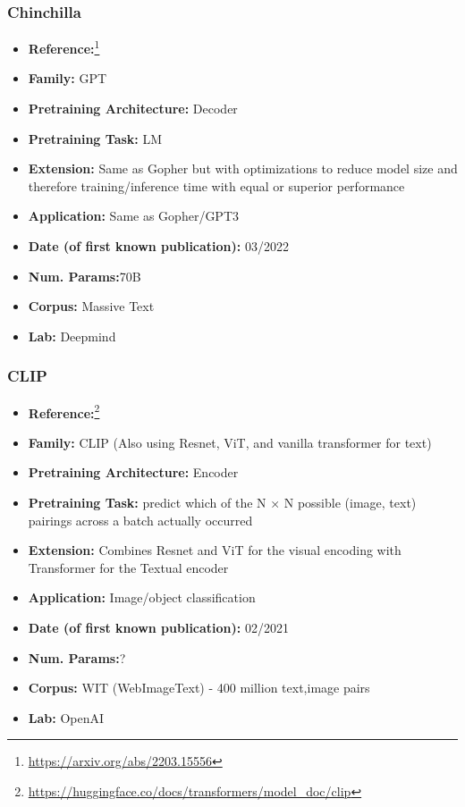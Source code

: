 \documentclass{article}
\begin{document}
\subsubsection{Chinchilla}

            \begin{itemize}
                \item \textbf{Reference:}\footnote{\url{https://arxiv.org/abs/2203.15556}}\cite{hoffmann2022training}
                \item \textbf{Family:} GPT 
                \item \textbf{Pretraining Architecture:} Decoder
                \item \textbf{Pretraining Task:} LM
                \item \textbf{Extension:} Same as Gopher but with optimizations to reduce model size and therefore training/inference time with equal or superior performance  
                \item \textbf{Application:} Same as Gopher/GPT3
                \item \textbf{Date (of first known publication):} 03/2022
                \item \textbf{Num. Params:}70B
                \item \textbf{Corpus:} Massive Text
                \item \textbf{Lab:} Deepmind
            \end{itemize}

\subsubsection{CLIP}

            \begin{itemize}
                \item \textbf{Reference:}\footnote{\url{https://huggingface.co/docs/transformers/model_doc/clip}}\cite{radford2021learning}
                \item \textbf{Family:} CLIP (Also using Resnet, ViT, and vanilla transformer for text) 
                \item \textbf{Pretraining Architecture:} Encoder
                \item \textbf{Pretraining Task:} predict which of the N × N possible (image, text) pairings across a batch actually occurred
                \item \textbf{Extension:} Combines Resnet and ViT for the visual encoding with Transformer for the Textual encoder  
                \item \textbf{Application:} Image/object classification
                \item \textbf{Date (of first known publication):} 02/2021
                \item \textbf{Num. Params:}?
                \item \textbf{Corpus:} WIT (WebImageText) - 400 million text,image pairs
                \item \textbf{Lab:} OpenAI
            \end{itemize}     
            
\end{document}
